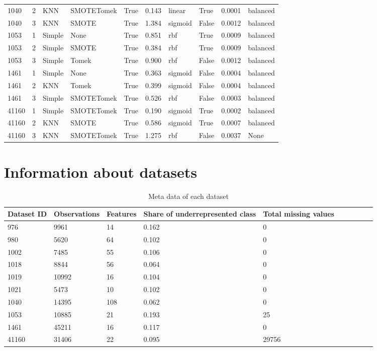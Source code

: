 \documentclass[11pt]{article}
\begin{document}
\begin{table}
\begin{tabular}{llllllllll}
1040 & 2 & KNN & SMOTETomek & True & 0.143 & linear & True & 0.0001 & balanced \\
1040 & 3 & KNN & SMOTE & True & 1.384 & sigmoid & False & 0.0012 & balanced \\
\midrule
1053 & 1 & Simple & None & True & 0.851 & rbf & True & 0.0009 & balanced \\
1053 & 2 & Simple & SMOTE & True & 0.384 & rbf & True & 0.0009 & balanced \\
1053 & 3 & Simple & Tomek & True & 0.900 & rbf & False & 0.0012 & balanced \\
\midrule
1461 & 1 & Simple & None & True & 0.363 & sigmoid & False & 0.0004 & balanced \\
1461 & 2 & KNN & Tomek & True & 0.399 & sigmoid & False & 0.0004 & balanced \\
1461 & 3 & Simple & SMOTETomek & True & 0.526 & rbf & False & 0.0003 & balanced \\
\midrule
41160 & 1 & Simple & SMOTETomek & True & 0.190 & sigmoid & True & 0.0002 & balanced \\
41160 & 2 & KNN & SMOTE & True & 0.586 & sigmoid & True & 0.0007 & balanced \\
41160 & 3 & KNN & SMOTETomek & True & 1.275 & rbf & False & 0.0037 & None \\
\bottomrule
\end{tabular}
\end{table}

\section{Information about datasets}

\begin{table}[H]
\center
\caption{Meta data of each dataset}
\begin{tabular}{llllllllll}
\toprule
Dataset ID & Observations & Features & Share of underrepresented class & Total missing values \\
\midrule
976 & 9961 & 14 & 0.162 & 0 \\
980 & 5620 & 64 & 0.102 & 0 \\
1002 & 7485 & 55 & 0.106 & 0 \\
1018 & 8844 & 56 & 0.064 & 0 \\
1019 & 10992 & 16 & 0.104 & 0 \\
1021 & 5473 & 10 & 0.102 & 0 \\
1040 & 14395 & 108 & 0.062 & 0 \\
1053 & 10885 & 21 & 0.193 & 25 \\
1461 & 45211 & 16 & 0.117 & 0 \\
41160 & 31406 & 22 & 0.095 & 29756 \\
\bottomrule
\end{tabular}
\end{table}
\end{document}
